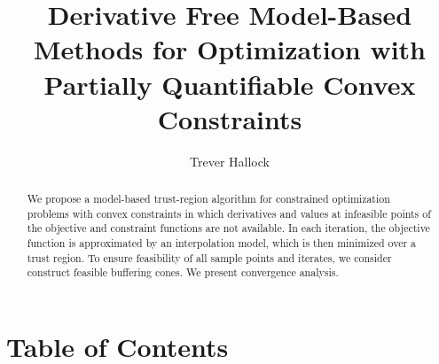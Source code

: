 \documentclass{article}
\title{Derivative Free Model-Based Methods for Optimization with Partially Quantifiable Convex Constraints}
\author{Trever Hallock}
\theoremstyle{case}
\numberwithin{theorem}{subsection}
\newcommand{\oalpha}{\tau_{\Delta}}
\begin{document}
\maketitle

\begin{abstract}

We propose a model-based trust-region algorithm for constrained optimization problems with convex constraints 
in which derivatives and values at infeasible points of the objective and constraint functions are not available.
In each iteration, the objective function is approximated by an interpolation model, which is then minimized over a trust region.
To ensure feasibility of all sample points and iterates, we consider construct feasible buffering cones.
We present convergence analysis.

\end{abstract}

\newpage

\section{Table of Contents}

\tableofcontents

\newpage







%
%



%
\end{document}
